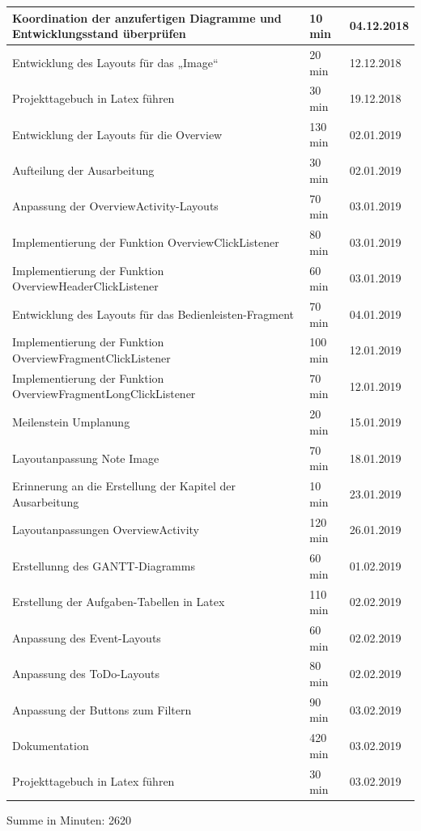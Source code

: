 \begin{longtable}{|p{10cm}|p{2cm}|p{2cm}|}
Koordination der anzufertigen Diagramme und Entwicklungsstand überprüfen & 10 min & 04.12.2018 \\ \hline
Entwicklung des Layouts für das „Image“ & 20 min & 12.12.2018 \\ \hline
Projekttagebuch in Latex führen & 30 min & 19.12.2018 \\ \hline
Entwicklung der Layouts für die Overview & 130 min & 02.01.2019 \\ \hline
Aufteilung der Ausarbeitung & 30 min & 02.01.2019 \\ \hline
Anpassung der OverviewActivity-Layouts & 70 min & 03.01.2019 \\ \hline
Implementierung der Funktion OverviewClickListener & 80 min & 03.01.2019 \\ \hline
Implementierung der Funktion OverviewHeaderClickListener & 60 min & 03.01.2019 \\ \hline
Entwicklung des Layouts für das Bedienleisten-Fragment & 70 min & 04.01.2019 \\ \hline
Implementierung der Funktion OverviewFragmentClickListener & 100 min & 12.01.2019 \\ \hline
Implementierung der Funktion OverviewFragmentLongClickListener & 70 min & 12.01.2019 \\ \hline
Meilenstein Umplanung & 20 min & 15.01.2019 \\ \hline
Layoutanpassung Note Image & 70 min & 18.01.2019 \\ \hline
Erinnerung an die Erstellung der Kapitel der Ausarbeitung & 10 min & 23.01.2019 \\ \hline
Layoutanpassungen OverviewActivity & 120 min & 26.01.2019 \\ \hline
Erstellunng des GANTT-Diagramms & 60 min & 01.02.2019 \\ \hline
Erstellung der Aufgaben-Tabellen in Latex & 110 min & 02.02.2019\\ \hline
Anpassung des Event-Layouts & 60 min & 02.02.2019 \\ \hline
Anpassung des ToDo-Layouts & 80 min & 02.02.2019 \\ \hline
Anpassung der Buttons zum Filtern & 90 min & 03.02.2019 \\ \hline
Dokumentation & 420 min & 03.02.2019 \\ \hline
Projekttagebuch in Latex führen & 30 min & 03.02.2019 \\ \hline
\end{longtable}
Summe in Minuten: 2620

\newpage
